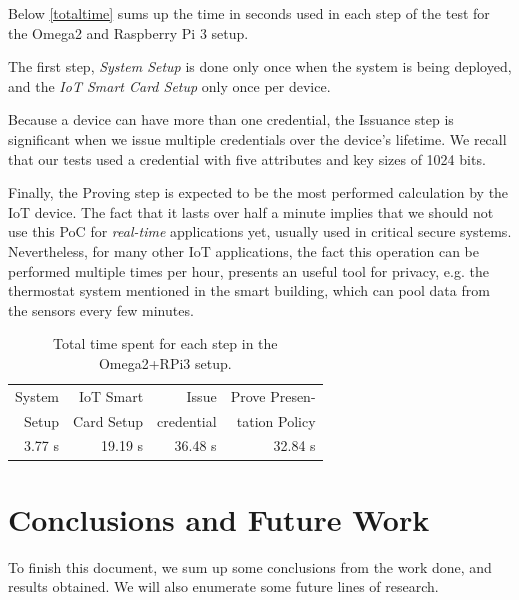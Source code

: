 \documentclass[journal]{IEEEtran}
\begin{document}
Below \autoref{totaltime} sums up the time in seconds used in each step of the test for the Omega2 and Raspberry Pi 3 setup.

The first step, \textit{System Setup} is done only once when the system is being deployed, and the \textit{IoT Smart Card Setup} only once per device.

Because a device can have more than one credential, the Issuance step is significant when we issue multiple credentials over the device's lifetime. We recall that our tests used a credential with five attributes and key sizes of 1024 bits.

Finally, the Proving step is expected to be the most performed calculation by the IoT device. The fact that it lasts over half a minute implies that we should not use this PoC for \textit{real-time} applications yet, usually used in critical secure systems. Nevertheless, for many other IoT applications, the fact this operation can be performed multiple times per hour, presents an useful tool for privacy, e.g. the thermostat system mentioned in the smart building, which can pool data from the sensors every few minutes.


\begin{table}[!ht]
	\begin{center}
		\begin{tabular}{|r|r|r|r|}
			\hline
			System & IoT Smart  & Issue  & Prove Presen-\\
			Setup & Card Setup & credential & tation Policy\\ \hline
			3.77 s & 19.19 s & 36.48 s & 32.84 s \\ \hline
		\end{tabular}
	\end{center}
	\caption{Total time spent for each step in the Omega2+RPi3 setup.}
	\label{totaltime}
\end{table}











\section{Conclusions and Future Work}\label{ch:conclusions}

To finish this document, we sum up some conclusions from the work done, and results 
obtained. We will also enumerate some future lines of research.
\end{document}
